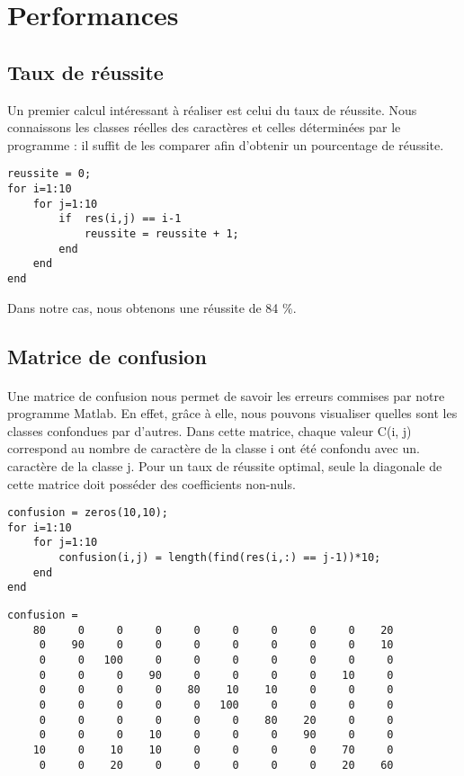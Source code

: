 \section{Performances}

\subsection{Taux de réussite}
Un premier calcul intéressant à réaliser est celui du taux de réussite. Nous connaissons les classes réelles des caractères et celles déterminées par le 
programme : il suffit de les comparer afin d'obtenir un pourcentage de réussite.
\\
\begin{lstlisting}
reussite = 0;
for i=1:10
	for j=1:10
		if  res(i,j) == i-1
			reussite = reussite + 1;
		end
	end
end
\end{lstlisting}

Dans notre cas, nous obtenons une réussite de 84 \%.

\subsection{Matrice de confusion}

\paragraph{}
Une matrice de confusion nous permet de savoir les erreurs commises par notre programme Matlab. En effet, grâce à elle, nous pouvons visualiser quelles sont 
les classes confondues par d'autres. Dans cette matrice, chaque valeur C(i, j) correspond au nombre de caractère de la classe i ont été confondu avec un. 
caractère de la classe j. Pour un taux de réussite optimal, seule la diagonale de cette matrice doit posséder des coefficients non-nuls.
\\
\begin{lstlisting}
confusion = zeros(10,10);
for i=1:10
    for j=1:10
        confusion(i,j) = length(find(res(i,:) == j-1))*10;
    end
end
\end{lstlisting}

\begin{lstlisting}
confusion = 
	80     0     0     0     0     0     0     0     0    20
	 0    90     0     0     0     0     0     0     0    10
	 0     0   100     0     0     0     0     0     0     0
	 0     0     0    90     0     0     0     0    10     0
	 0     0     0     0    80    10    10     0     0     0
	 0     0     0     0     0   100     0     0     0     0
	 0     0     0     0     0     0    80    20     0     0
	 0     0     0    10     0     0     0    90     0     0
	10     0    10    10     0     0     0     0    70     0
	 0     0    20     0     0     0     0     0    20    60
\end{lstlisting}

